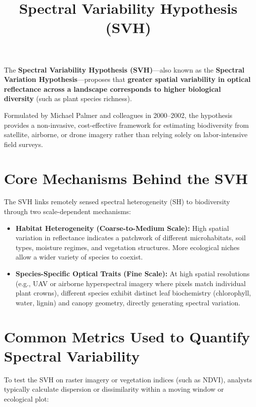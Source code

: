 \documentclass[11pt,letterpaper]{article}
\title{\textbf{Spectral Variability Hypothesis (SVH)}}
\author{}
\date{}
\begin{document}
\maketitle
\vspace{-2em}

The \textbf{Spectral Variability Hypothesis (SVH)}---also known as the \textbf{Spectral Variation Hypothesis}---proposes that \textbf{greater spatial variability in optical reflectance across a landscape corresponds to higher biological diversity} (such as plant species richness).

Formulated by Michael Palmer and colleagues in 2000--2002, the hypothesis provides a non-invasive, cost-effective framework for estimating biodiversity from satellite, airborne, or drone imagery rather than relying solely on labor-intensive field surveys.

\section{Core Mechanisms Behind the SVH}

The SVH links remotely sensed spectral heterogeneity (SH) to biodiversity through two scale-dependent mechanisms:

\begin{itemize}[leftmargin=1.5em]
    \item \textbf{Habitat Heterogeneity (Coarse-to-Medium Scale):} High spatial variation in reflectance indicates a patchwork of different microhabitats, soil types, moisture regimes, and vegetation structures. More ecological niches allow a wider variety of species to coexist.
    \item \textbf{Species-Specific Optical Traits (Fine Scale):} At high spatial resolutions (e.g., UAV or airborne hyperspectral imagery where pixels match individual plant crowns), different species exhibit distinct leaf biochemistry (chlorophyll, water, lignin) and canopy geometry, directly generating spectral variation.
\end{itemize}

\section{Common Metrics Used to Quantify Spectral Variability}

To test the SVH on raster imagery or vegetation indices (such as NDVI), analysts typically calculate dispersion or dissimilarity within a moving window or ecological plot:
\end{document}
